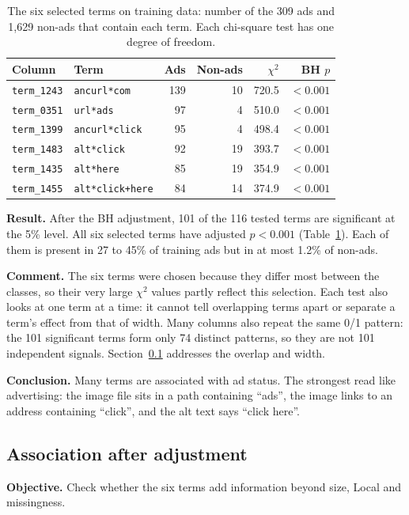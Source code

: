 \begin{table}[htbp]
\centering
\caption{The six selected terms on training data: number of the 309 ads and 1,629 non-ads that contain each term. Each chi-square test has one degree of freedom.}
\label{tab:infer-term-chi}
\begin{tabular}{llrrrr}
\toprule
Column & Term & Ads & Non-ads & $\chi^2$ & BH $p$\\
\midrule
\texttt{term\_1243} & \texttt{ancurl*com} & 139 & 10 & 720.5 & $<0.001$\\
\texttt{term\_0351} & \texttt{url*ads} & 97 & 4 & 510.0 & $<0.001$\\
\texttt{term\_1399} & \texttt{ancurl*click} & 95 & 4 & 498.4 & $<0.001$\\
\texttt{term\_1483} & \texttt{alt*click} & 92 & 19 & 393.7 & $<0.001$\\
\texttt{term\_1435} & \texttt{alt*here} & 85 & 19 & 354.9 & $<0.001$\\
\texttt{term\_1455} & \texttt{alt*click+here} & 84 & 14 & 374.9 & $<0.001$\\
\bottomrule
\end{tabular}
\end{table}

\textbf{Result.} After the BH adjustment, 101 of the 116 tested terms are
significant at the 5\% level. All six selected terms have adjusted
$p<0.001$ (Table~\ref{tab:infer-term-chi}). Each of them is present in 27
to 45\% of training ads but in at most 1.2\% of non-ads.

\textbf{Comment.} The six terms were chosen because they differ most
between the classes, so their very large $\chi^2$ values partly reflect this
selection. Each test also looks at one term at a time: it cannot tell
overlapping terms apart or separate a term's effect from that of width.
Many columns also repeat the same 0/1 pattern: the 101 significant terms
form only 74 distinct patterns, so they are not 101 independent signals.
Section~\ref{sec:infer-adjusted} addresses the overlap and width.

\textbf{Conclusion.} Many terms are associated with ad status. The strongest
read like advertising: the image file sits in a path containing ``ads'',
the image links to an address containing ``click'', and the alt text says
``click here''.

\subsection{Association after adjustment}
\label{sec:infer-adjusted}
\textbf{Objective.} Check whether the six terms add information beyond
size, Local and missingness.

